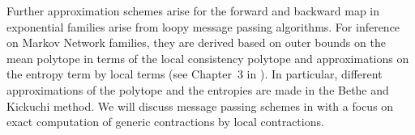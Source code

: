 Further approximation schemes arise for the forward and backward map in exponential families arise from loopy message passing algorithms.
For inference on Markov Network families, they are derived based on outer bounds on the mean polytope in terms of the local consistency polytope and approximations on the entropy term by local terms (see Chapter~3 in \cite{wainwright_graphical_2008}).
In particular, different approximations of the polytope and the entropies are made in the Bethe and Kickuchi method.
We will discuss message passing schemes in  with a focus on exact computation of generic contractions by local contractions.

